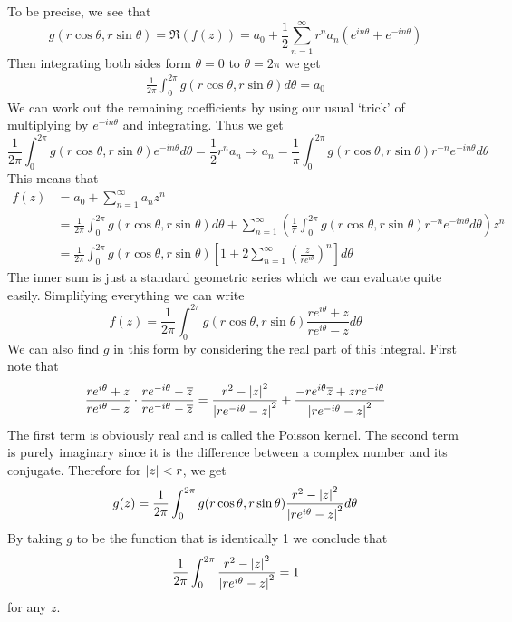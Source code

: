 To be precise, we see that
$$ g(r \cos \theta, r \sin \theta) = \Re(f(z)) = a_0 + \frac{1}{2} \sum_{n = 1}^\infty r^n a_n(e^{in \theta} + e^{-in \theta}) $$
Then integrating both sides form $\theta = 0$ to $\theta = 2\pi$ we get
\begin{align*}
    \frac{1}{2\pi} \int_0^{2\pi} g(r \cos \theta, r \sin \theta) d\theta = a_0
\end{align*}
We can work out the remaining coefficients by using our usual `trick' of multiplying by $e^{-in\theta}$ and integrating. Thus we get
$$\frac{1}{2\pi} \int_0^{2\pi} g(r \cos \theta, r \sin \theta)e^{-in \theta} d\theta = \frac{1}{2} r^n a_n \Rightarrow a_n = \frac{1}{\pi} \int_0^{2\pi} g(r \cos \theta, r \sin \theta) r^{-n} e^{-in \theta} d\theta$$
This means that
\begin{align*}
    f(z) &= a_0 + \sum_{n = 1}^\infty a_n z^n\\
    &= \frac{1}{2\pi} \int_0^{2\pi} g(r \cos \theta, r \sin \theta) d\theta + \sum_{n = 1}^\infty \left( \frac{1}{\pi} \int_0^{2\pi} g(r \cos \theta, r \sin \theta) r^{-n} e^{-in \theta} d\theta \right) z^n\\
    &= \frac{1}{2\pi} \int_0^{2\pi} g(r \cos \theta, r \sin \theta) \left[ 1 + 2 \sum_{n = 1}^\infty \left( \frac{z}{re^{i\theta}} \right)^n \right] d\theta
\end{align*}
The inner sum is just a standard geometric series which we can evaluate quite easily. Simplifying everything we can write
$$f(z) = \frac{1}{2\pi} \int_0^{2\pi} g(r \cos \theta, r \sin \theta) \frac{re^{i\theta} + z}{re^{i \theta} - z} d\theta$$
We can also find $g$ in this form by considering the real part of this integral. First note that
\begin{align*}
    \frac{re^{i \theta} + z}{re^{i \theta} - z} \cdot \frac{re^{-i \theta} - \overline{z}}{re^{-i \theta} - \overline{z}} = \frac{r^2 - \left|z\right|^2}{\left|re^{- i\theta} - z\right|^2} + \frac{-re^{i \theta} \overline{z} + zre^{-i \theta}}{\left|re^{- i\theta} - z\right|^2}
\end{align*}
The first term is obviously real and is called the Poisson kernel. The second term is purely imaginary since it is the difference between a complex number and its conjugate. Therefore for $\left|z\right| < r$, we get
$$g(z) = \frac{1}{2\pi} \int_0^{2\pi} g(r \cos \theta, r \sin \theta) \frac{r^2 - \left|z\right|^2}{\left|re^{i\theta} - z\right|^2} d\theta$$
By taking $g$ to be the function that is identically 1 we conclude that
$$\frac{1}{2\pi}\int_{0}^{2\pi} \frac{r^2 - \left|z\right|^2}{\left|re^{i\theta} - z\right|^2} = 1$$
for any $z$. 

